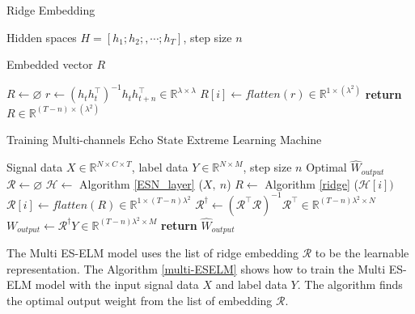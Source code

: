 \begin{algorithm}
    \caption{Ridge Embedding}
    \label{ridge}
    \begin{algorithmic}[1]
        \renewcommand{\algorithmicrequire}{\textbf{Input:}}
        \renewcommand{\algorithmicensure}{\textbf{Output:}}
        \Require Hidden spaces $H = [h_1; h_2;,\cdots;h_{T}]$, step size $n$

    \Ensure Embedded vector $R$

    \State $R\gets\varnothing$
        \State $r \gets (h_t h_t^\top)^{-1} h_t h_{t+n}^\top \in\mathbb{R}^{\lambda\times\lambda}$ 
        \State $R[i] \gets flatten(r) \in\mathbb{R}^{1\times(\lambda^2)}$
    \EndFor
    \State \textbf{return} $R\in\mathbb{R}^{(T-n)\times(\lambda^2)}$
    \end{algorithmic}
\end{algorithm}

\begin{algorithm}
    \caption{Training Multi-channels Echo State Extreme Learning Machine}
    \label{multi-ESELM}
    \begin{algorithmic}[1]
        \renewcommand{\algorithmicrequire}{\textbf{Input:}}
        \renewcommand{\algorithmicensure}{\textbf{Output:}}
        \Require Signal data $X\in\mathbb{R}^{N\times C\times T}$, label data $Y\in\mathbb{R}^{N\times M}$, step size $n$
        \Ensure Optimal $\hat{W}_{output}$
        \State $\mathcal{R}\gets\varnothing$
        \State $\mathcal{H}\gets $ Algorithm \ref{ESN_layer} ($X,\ n$)
        \State $R \gets $ Algorithm \ref{ridge} ($\mathcal{H}[i])$
            \State $\mathcal{R}[i]\gets flatten(R)\in\mathbb{R}^{1\times(T-n)\lambda^2}$
        \EndFor
        \State $\mathcal{R}^\dagger\gets (\mathcal{R}^\top \mathcal{R})^{-1}\mathcal{R}^\top\in\mathbb{R}^{(T-n)\lambda^2\times N}$
        \State $W_{output}\gets \mathcal{R}^\dagger Y\in\mathbb{R}^{(T-n)\lambda^2\times M}$
        \State \textbf{return} $\hat{W}_{output}$
    \end{algorithmic} 
\end{algorithm}

The Multi ES-ELM model uses the list of ridge embedding $\mathcal{R}$ to be the learnable representation. The Algorithm \ref{multi-ESELM} shows how to train the Multi ES-ELM model with the input signal data $X$ and label data $Y$. The algorithm finds the optimal output weight from the list of embedding $\mathcal{R}$.  


